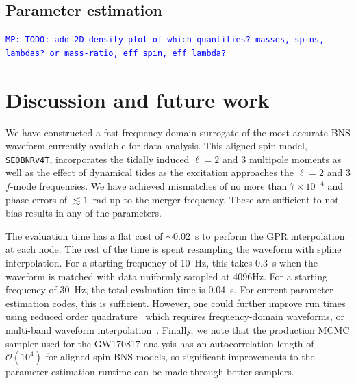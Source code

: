 \documentclass[prd,aps,letter,twocolumn,floatfix,notitlepage,nofootinbib]{revtex4-1}
\newcommand{\MP}[1]{{\textcolor{blue}{\texttt{MP: #1}} }}
\begin{document}
\subsection{Parameter estimation}

\MP{TODO: add 2D density plot of which quantities? masses, spins, lambdas?
or mass-ratio, eff spin, eff lambda?}


\section{Discussion and future work}

We have constructed a fast frequency-domain surrogate of the most accurate BNS waveform currently available for data analysis. This aligned-spin model, \texttt{SEOBNRv4T}, incorporates the tidally induced $\ell=2$ and 3 multipole moments as well as the effect of dynamical tides as the excitation approaches the $\ell=2$ and 3 $f$-mode frequencies. We have achieved mismatches of no more than $7 \times 10^{-4}$ and phase errors of $\lesssim 1$~rad up to the merger frequency. These are sufficient to not bias results in any of the parameters.

The evaluation time has a flat cost of $\sim 0.02$~s to perform the GPR interpolation at each node. The rest of the time is spent resampling the waveform with spline interpolation. For a starting frequency of 10~Hz, this takes 0.3~s when the waveform is matched with data uniformly sampled at 4096Hz. For a starting frequency of 30~Hz, the total evaluation time is 0.04~s. For current parameter estimation codes, this is sufficient. However, one could further improve run times using reduced order quadrature~\cite{Antil2013, CanizaresFieldGair2013, CanizaresFieldGair2015, Smith:2016qas} which requires frequency-domain waveforms, or multi-band waveform interpolation~\cite{VinciguerraVeitchMandel2017}. Finally, we note that the production MCMC sampler used for the GW170817 analysis has an autocorrelation length of $\mathcal{O}(10^4)$ for aligned-spin BNS models, so significant improvements to the parameter estimation runtime can be made through better samplers. 
\end{document}
